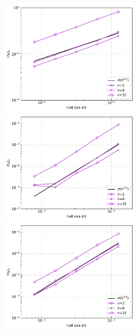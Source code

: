 \documentclass[12pt]{article}
\numberwithin{equation}{subsection}
\begin{document}
\begin{figure}
	\vspace{-0.35in}
	
	\begin{multicols}{3}
		\includegraphics[width=6.85cm]{../Annulus_Benchmark_Kramer/benchmark_figs/case3_k_0_p_err_conv_vel_penalty_2.5e+08_stokes_tol_1.0e-10.pdf}\par
		\hspace{-0.08in} 
		\includegraphics[width=6.85cm]{../Annulus_Benchmark_Kramer/benchmark_figs/case4_k_2_p_err_conv_vel_penalty_2.5e+08_stokes_tol_1.0e-10.pdf}\par
		\hspace{-0.12in}
		\includegraphics[width=6.85cm]{../Annulus_Benchmark_Kramer/benchmark_figs/case4_k_8_p_err_conv_vel_penalty_2.5e+08_stokes_tol_1.0e-10.pdf}
	\end{multicols}
	
\end{figure}
\end{document}
